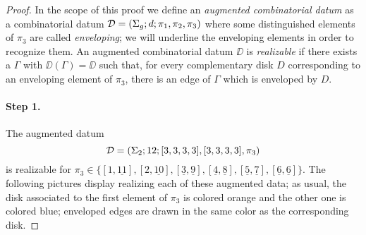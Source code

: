 \begin{proof}
\def\env#1{\underline{#1}}
In the scope of this proof we define an \emph{augmented combinatorial datum} as a combinatorial datum $\mathcal{D}=(\Sigma_{g};d;\pi_1,\pi_2,\pi_3)$ where some distinguished elements of $\pi_3$ are called \emph{enveloping}; we will underline the enveloping elements in order to recognize them. An augmented combinatorial datum $\DD$ is \emph{realizable} if there exists a \dessin{} $\Gamma$ with $\DD(\Gamma)=\DD$ such that, for every complementary disk $D$ corresponding to an enveloping element of $\pi_3$, there is an edge of $\Gamma$ which is enveloped by $D$.
\paragraph{Step 1.} The augmented datum
\[
\mathcal{D}=(\Sigma_{2};12;[3,3,3,3],[3,3,3,3],\pi_3)
\]
is realizable for $\pi_3\in\{[1,\env{11}],[2,\env{10}],[\env{3},\env{9}],[\env{4},\env{8}],[\env{5},\env{7}],[\env{6},\env{6}]\}$. The following pictures display \dessins{} realizing each of these augmented data; as usual, the disk associated to the first element of $\pi_3$ is colored orange and the other one is colored blue; enveloped edges are drawn in the same color as the corresponding disk.

\bgroup

\def\myradius{1.2}
\def\draweightvertices{
\path[use as bounding box] circle(1.6*\myradius);
\path (0:\myradius) coordinate (w1) pic{white vertex};
\path (90:\myradius) coordinate (w2) pic{white vertex};
\path (180:\myradius) coordinate (w3) pic{white vertex};
\path (270:\myradius) coordinate (w4) pic{white vertex};
\path (45:\myradius) coordinate (b1) pic{black vertex};
\path (135:\myradius) coordinate (b2) pic{black vertex};
\path (225:\myradius) coordinate (b3) pic{black vertex};
\path (315:\myradius) coordinate (b4) pic{black vertex};
}


\end{proof}
